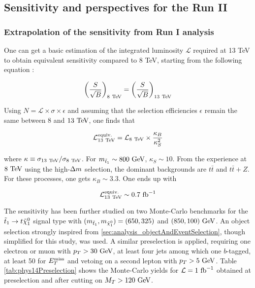         \subsection{Sensitivity and perspectives for the Run II}
        
        \loremipsum

            \subsubsection{Extrapolation of the sensitivity from Run I analysis}

        One can get a basic estimation of the integrated luminosity $\mathcal{L}$ required 
        at 13 TeV to obtain equivalent sensitivity compared to 8 TeV, starting from the 
        following equation : 

        $$ \left( \frac{S}{\sqrt{B}} \right)_{8~\text{TeV}} = \left( \frac{S}{\sqrt{B}} \right)_{13~\text{TeV}}  $$

        Using $N = \mathcal{L} \times \sigma \times \epsilon$ and assuming that the selection
        efficiencies $\epsilon$ remain the same between $8$ and $13~\text{TeV}$, one finds that
        
        $$ \mathcal{L}^\text{equiv.}_{13~\text{TeV}} = \mathcal{L}_{8~\text{TeV}} \times \frac{\kappa_B}{\kappa^2_S} $$

        where $\kappa \equiv \sigma_{13~\text{TeV}} / \sigma_{8~\text{TeV}}$. For $m_{\tilde{t}_1} \sim 800~\text{GeV}$,
        $\kappa_S \sim 10$. From the experience at $8~\text{TeV}$ using the high-$\Delta m$ selection,
        the dominant backgrounds are $t\bar{t}$ and $t\bar{t}+Z$. For these processes, one
        gets $\kappa_B \sim 3.3$. One ends up with

        $$ \mathcal{L}^\text{equiv.}_{13~\text{TeV}} \sim 0.7~\text{fb}^{-1}$$

        The sensitivity has been further studied on two Monte-Carlo benchmarks for the 
        $\tilde{t}_1 \rightarrow t \tilde{\chi}_1^0$ signal type with $(m_{\tilde{t}_1},
        m_{\tilde{\chi}_1^0}) = (650,325)$ and $(850,100) ~\text{GeV}$. An object selection 
        strongly inspired from \ref{sec:analysis_objectAndEventSelection}, though simplified
        for this study, was used. A similar preselection is applied, requiring one electron
        or muon with $p_T > 30~\text{GeV}$, at least four jets among which one $b$-tagged, at least
        50 \GeV for $E_T^\text{miss}$ and vetoing on a second lepton with $p_T > 5~\text{GeV}$. Table \ref{tab:phys14Preselection}
        shows the Monte-Carlo yields for $\mathcal{L} = 1~\text{fb}^{-1}$ obtained at preselection 
        and after cutting on $M_T > 120~\text{GeV}$.


